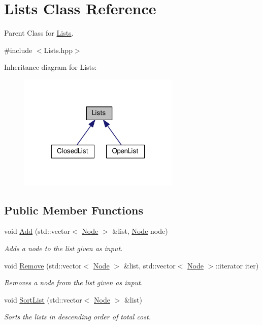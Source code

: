 \hypertarget{classLists}{}\section{Lists Class Reference}
\label{classLists}


Parent Class for \hyperlink{classLists}{Lists}.  




{\ttfamily \#include $<$Lists.\+hpp$>$}



Inheritance diagram for Lists\+:
\nopagebreak
\begin{figure}[H]
\begin{center}
\leavevmode
\includegraphics[width=218pt]{classLists__inherit__graph}
\end{center}
\end{figure}
\subsection*{Public Member Functions}
\begin{DoxyCompactItemize}
\item 
void \hyperlink{classLists_aed567c0eb29d02a7ac16fb78ee2a9038}{Add} (std\+::vector$<$ \hyperlink{classNode}{Node} $>$ \&list, \hyperlink{classNode}{Node} node)
\begin{DoxyCompactList}\small\item\em Adds a node to the list given as input. \end{DoxyCompactList}\item 
void \hyperlink{classLists_af907564ceb484798f5b9f2f64d34f283}{Remove} (std\+::vector$<$ \hyperlink{classNode}{Node} $>$ \&list, std\+::vector$<$ \hyperlink{classNode}{Node} $>$\+::iterator iter)
\begin{DoxyCompactList}\small\item\em Removes a node from the list given as input. \end{DoxyCompactList}\item 
void \hyperlink{classLists_adc452dcc02bc2f45d43aa9e41e9a57a5}{Sort\+List} (std\+::vector$<$ \hyperlink{classNode}{Node} $>$ \&list)
\begin{DoxyCompactList}\small\item\em Sorts the lists in descending order of total cost. \end{DoxyCompactList}\end{DoxyCompactItemize}
